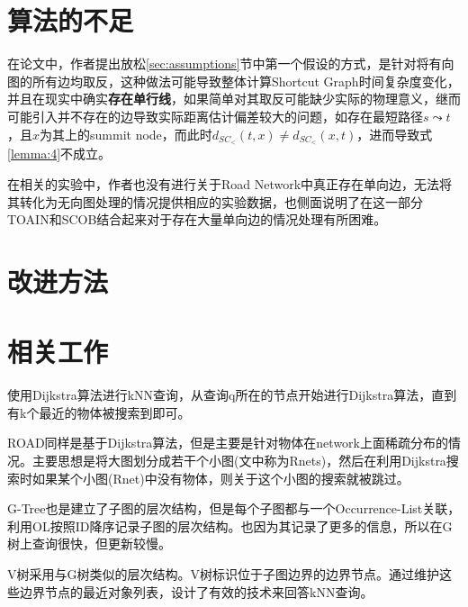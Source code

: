 \documentclass{ML}
\begin{document}
\section{算法的不足}\label{sec:shortcoming}
在论文中，作者提出放松\ref{sec:assumptions}节中第一个假设的方式，是针对将有向图的所有边均取反，这种做法可能导致整体计算Shortcut Graph时间复杂度变化，并且在现实中确实\textbf{存在单行线}，如果简单对其取反可能缺少实际的物理意义，继而可能引入并不存在的边导致实际距离估计偏差较大的问题，如存在最短路径$s \leadsto t$，且$x$为其上的summit node，而此时$d_{SC_{<}}(t, x) \neq d_{SC_{<}}(x, t)$，进而导致式\eqref{lemma:4}不成立。

在相关的实验中，作者也没有进行关于Road Network中真正存在单向边，无法将其转化为无向图处理的情况提供相应的实验数据，也侧面说明了在这一部分TOAIN和SCOB结合起来对于存在大量单向边的情况处理有所困难。
\section{改进方法}

\section{相关工作}
使用Dijkstra算法进行kNN查询，从查询q所在的节点开始进行Dijkstra算法，直到有k个最近的物体被搜索到即可。

ROAD\cite{ROAD}同样是基于Dijkstra算法，但是主要是针对物体在network上面稀疏分布的情况。主要思想是将大图划分成若干个小图(文中称为Rnets)，然后在利用Dijkstra搜索时如果某个小图(Rnet)中没有物体，则关于这个小图的搜索就被跳过。

G-Tree\cite{G-tree}也是建立了子图的层次结构，但是每个子图都与一个Occurrence-List关联，利用OL按照ID降序记录子图的层次结构。也因为其记录了更多的信息，所以在G树上查询很快，但更新较慢。

V树\cite{V-tree}采用与G树类似的层次结构。V树标识位于子图边界的边界节点。通过维护这些边界节点的最近对象列表，设计了有效的技术来回答kNN查询。

\appendix
\end{document}
